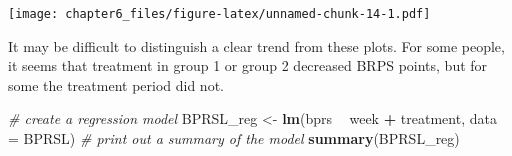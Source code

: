 \documentclass[]{article}
\newenvironment{Shaded}{\begin{snugshade}}{\end{snugshade}}
\newcommand{\CommentTok}[1]{\textcolor[rgb]{0.56,0.35,0.01}{\textit{#1}}}
\newcommand{\DataTypeTok}[1]{\textcolor[rgb]{0.13,0.29,0.53}{#1}}
\newcommand{\DecValTok}[1]{\textcolor[rgb]{0.00,0.00,0.81}{#1}}
\newcommand{\KeywordTok}[1]{\textcolor[rgb]{0.13,0.29,0.53}{\textbf{#1}}}
\newcommand{\NormalTok}[1]{#1}
\newcommand{\OperatorTok}[1]{\textcolor[rgb]{0.81,0.36,0.00}{\textbf{#1}}}
\newcommand{\StringTok}[1]{\textcolor[rgb]{0.31,0.60,0.02}{#1}}
\begin{document}
\begin{Shaded}
\end{Shaded}

\texttt{[image: chapter6\_files/figure-latex/unnamed-chunk-14-1.pdf]}

It may be difficult to distinguish a clear trend from these plots. For
some people, it seems that treatment in group 1 or group 2 decreased
BRPS points, but for some the treatment period did not.

\begin{Shaded}
\begin{Highlighting}[]
\CommentTok{# create a regression model}
\NormalTok{BPRSL_reg <-}\StringTok{ }\KeywordTok{lm}\NormalTok{(bprs }\OperatorTok{~}\StringTok{ }\NormalTok{week }\OperatorTok{+}\StringTok{ }\NormalTok{treatment, }\DataTypeTok{data =}\NormalTok{ BPRSL)}
\CommentTok{# print out a summary of the model}
\KeywordTok{summary}\NormalTok{(BPRSL_reg)}
\end{Highlighting}
\end{Shaded}
\end{document}
